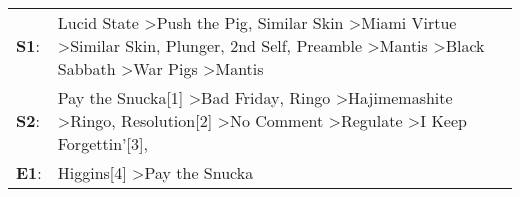 \begin{supertabular}{p{0.03\textwidth}p{0.92\textwidth}}
 \textbf{S1}:  &  Lucid State\textsuperscript{} \textgreater \enspace Push the Pig\textsuperscript{}, \enspace Similar Skin\textsuperscript{} \textgreater \enspace Miami Virtue\textsuperscript{} \textgreater \enspace Similar Skin\textsuperscript{}, \enspace Plunger\textsuperscript{}, \enspace 2nd Self\textsuperscript{}, \enspace Preamble\textsuperscript{} \textgreater \enspace Mantis\textsuperscript{} \textgreater \enspace Black Sabbath\textsuperscript{} \textgreater \enspace War Pigs\textsuperscript{} \textgreater \enspace Mantis\textsuperscript{}  \enspace  \\
 \textbf{S2}:  &                                                                                  Pay the Snucka[1]\textsuperscript{} \textgreater \enspace Bad Friday\textsuperscript{}, \enspace Ringo\textsuperscript{} \textgreater \enspace Hajimemashite\textsuperscript{} \textgreater \enspace Ringo\textsuperscript{}, \enspace Resolution[2]\textsuperscript{} \textgreater \enspace No Comment\textsuperscript{} \textgreater \enspace Regulate\textsuperscript{} \textgreater \enspace I Keep Forgettin'[3]\textsuperscript{}, \textsuperscript{}  \enspace  \\
 \textbf{E1}:  &                                                                                                                                                                                                                                                                                                                                                                                                                                                                       Higgins[4]\textsuperscript{} \textgreater \enspace Pay the Snucka\textsuperscript{}  \enspace  \\
\end{supertabular}
